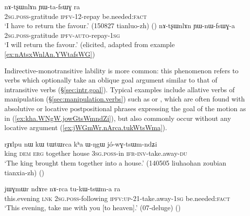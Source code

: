 \begin{exe}
\ex 
\begin{xlist}
\ex \label{ex:nAtsxWnlAn.YWtafsWG}
\gll  nɤ-tʂɯnlɤn ɲɯ-ta-fsɯɣ ra \\
\textsc{2sg}.\textsc{poss}-gratitude \textsc{ipfv}-1\fl{}2-repay be.needed:\textsc{fact} \\
\glt `I have to return the favour.' (150827 tianluo-zh) ()
\ex \label{ex:nAtsxWnlAn.YWnWfsWGa}
\gll nɤ-tʂɯnlɤn ɲɯ-nɯ-fsɯɣ-a \\
\textsc{2sg}.\textsc{poss}-gratitude \textsc{ipfv}-\textsc{auto}-repay-\textsc{1sg} \\
\glt `I will return the favour.' (elicited, adapted from example \ref{ex:nAtsxWnlAn.YWtafsWG})
\end{xlist}
\end{exe}

Indirective-monotransitive lability is more common:  this phenomenon refers to verbs which optionally take an oblique goal argument similar to that of intransitive verbs (§\ref{sec:intr.goal}). Typical examples include allative verbs of manipulation (§\ref{sec:manipulation.verbs}) such as  or , which are often found with absolutive or locative postpositional phrases expressing the goal of the motion as in (\ref{ex:kha.WNgW.jowGtsWmndZi}), but also commonly occur without any locative argument (\ref{ex:jWGmWr.nArca.tukWtsWma}).
 
 \begin{exe}
\ex \label{ex:kha.WNgW.jowGtsWmndZi}
\gll rɟɤlpu nɯ kɯ tɯtɯrca kʰa ɯ-ŋgɯ jó-wɣ-tsɯm-ndʑi  \\
king \textsc{dem} \textsc{erg} together house \textsc{3sg}.\textsc{poss}-in \textsc{ifr}-\textsc{inv}-take.away-\textsc{du} \\
\glt `The king brought them together into a house.' (140505 liuhaohan zoubian tianxia-zh)
()
\end{exe}

\begin{exe}
\ex \label{ex:jWGmWr.nArca.tukWtsWma}
\gll jɯɣmɯr ndɤre nɤ-rca tu-kɯ-tsɯm-a ra \\
this.evening \textsc{lnk} \textsc{2sg}.\textsc{poss}-following \textsc{ipfv}:\textsc{up}-2\fl {}1-take.away-\textsc{1sg} be.needed:\textsc{fact} \\
\glt `This evening, take me with you [to heaven].' (07-deluge) 	()
\end{exe}

